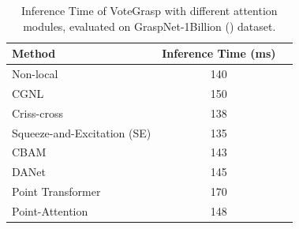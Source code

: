 \begin{table}[h]
\caption{Inference Time of VoteGrasp with different attention modules, evaluated on GraspNet-1Billion (\textcolor{cyan}{\cite{fang2020graspnet}}) dataset.}
\label{tab:real_ex}
\begin{center}
\begin{tabular}{|l|c|c|}
\hline
Method & Inference Time (ms) \\
\hline
Non-local & 140 \\
\hline
CGNL & 150 \\
\hline
Criss-cross & 138 \\
\hline
Squeeze-and-Excitation (SE) & 135 \\
\hline
CBAM & 143 \\
\hline
DANet & 145 \\
\hline
Point Transformer & 170 \\
\hline
Point-Attention & 148 \\
\hline
\end{tabular}
\end{center}
\end{table}


